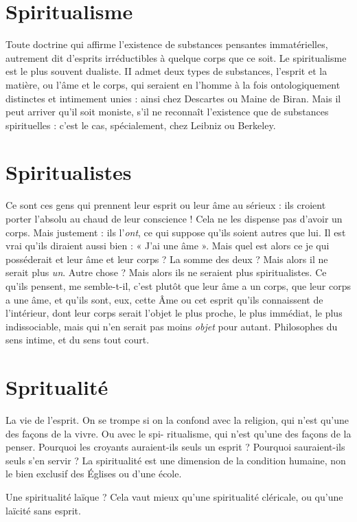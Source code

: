 \section{Spiritualisme}
Toute doctrine qui affirme l’existence de substances pensantes
immatérielles, autrement dit d’esprits irréductibles
à quelque corps que ce soit. Le spiritualisme est le plus souvent dualiste. II
admet deux types de substances, l'esprit et la matière, ou l'âme et le corps, qui
seraient en l’homme à la fois ontologiquement distinctes et intimement unies :
ainsi chez Descartes ou Maine de Biran. Mais il peut arriver qu’il soit moniste,
s’il ne reconnaît l’existence que de substances spirituelles : c’est le cas, spécialement,
chez Leibniz ou Berkeley.

\section{Spiritualistes}
Ce sont ces gens qui prennent leur esprit ou leur âme au
sérieux : ils croient porter l’absolu au chaud de leur
conscience ! Cela ne les dispense pas d’avoir un corps. Mais justement : ils l’{\it ont},
ce qui suppose qu'ils soient autres que lui. Il est vrai qu’ils diraient aussi bien :
« J'ai une âme ». Mais quel est alors ce je qui posséderait et leur âme et leur
corps ? La somme des deux ? Mais alors il ne serait plus {\it un}. Autre chose ? Mais
alors ils ne seraient plus spiritualistes. Ce qu’ils pensent, me semble-t-il, c’est
plutôt que leur âme a un corps, que leur corps a une âme, et qu’ils sont, eux,
cette Âme ou cet esprit qu’ils connaissent de l’intérieur, dont leur corps serait
l’objet le plus proche, le plus immédiat, le plus indissociable, mais qui n’en
serait pas moins {\it objet} pour autant. Philosophes du sens intime, et du sens tout
court.

\section{Spritualité}
La vie de l'esprit. On se trompe si on la confond avec la religion,
qui n’est qu’une des façons de la vivre. Ou avec le spi-
ritualisme, qui n’est qu’une des façons de la penser. Pourquoi les croyants
auraient-ils seuls un esprit ? Pourquoi sauraient-ils seuls s’en servir ? La spiritualité
est une dimension de la condition humaine, non le bien exclusif des
Églises ou d’une école.

Une spiritualité laïque ? Cela vaut mieux qu’une spiritualité cléricale, ou
qu'une laïcité sans esprit.

